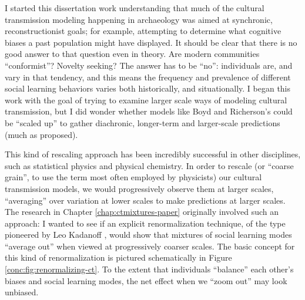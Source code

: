 I started this dissertation work understanding that much of the cultural transmission modeling happening in archaeology was aimed at synchronic, reconstructionist goals; for example, attempting to determine what cognitive biases a past population might have displayed.  It should be clear that there is no good answer to that question even in theory.  Are modern communities ``conformist''?  Novelty seeking?  The answer has to be ``no'':  individuals are, and vary in that tendency, and this means the frequency and prevalence of different social learning behaviors varies both historically, and situationally.  I began this work with the goal of trying to examine larger scale ways of modeling cultural transmission, but I did wonder whether models like Boyd and Richerson's could be ``scaled up'' to gather diachronic, longer-term and larger-scale predictions (much as \citealt{Kandler2013} proposed).  

This kind of rescaling approach has been incredibly successful in other disciplines, such as statistical physics and physical chemistry.  In order to rescale (or ``coarse grain'', to use the term most often employed by physicists) our cultural transmission models, we would progressively observe them at larger scales, ``averaging'' over variation at lower scales to make predictions at larger scales.  The research in Chapter \ref{chap:ctmixtures-paper} originally involved such an approach:  I wanted to see if an explicit renormalization technique, of the type pioneered by Leo Kadanoff \citeyearpar{kadanoff1966scaling,Kadanoff2000}, would show that mixtures of social learning modes ``average out'' when viewed at progressively coarser scales.  The basic concept for this kind of renormalization is pictured schematically in Figure \ref{conc:fig:renormalizing-ct}.  To the extent that individuals ``balance'' each other's biases and social learning modes, the net effect when we ``zoom out'' may look unbiased.

